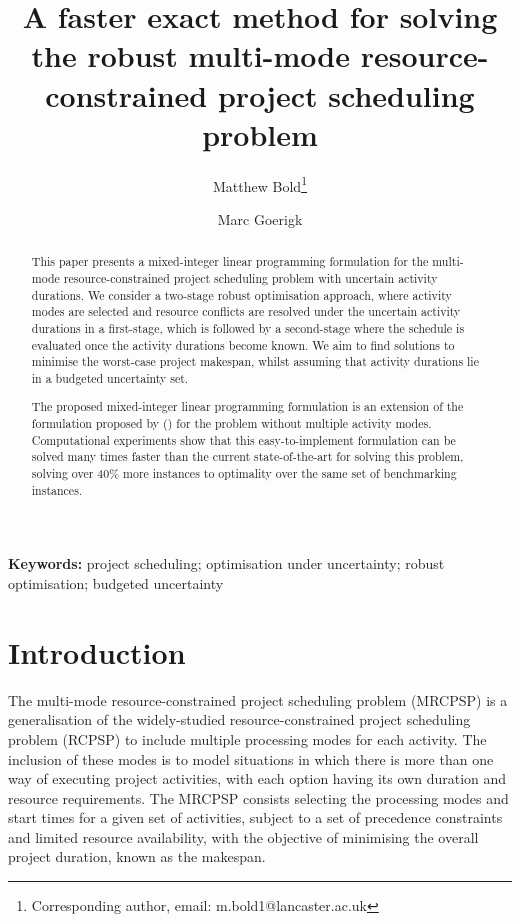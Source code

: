 \documentclass[a4paper,abstracton]{scrartcl}
\begin{document}
\title{A faster exact method for solving the robust multi-mode resource-constrained project scheduling problem}

\author[1]{Matthew Bold\footnote{Corresponding author, email: m.bold1@lancaster.ac.uk}}
\author[2]{Marc Goerigk}

\date{}

\maketitle

\nobibliography*  %

\begin{abstract}
	This paper presents a mixed-integer linear programming formulation for the multi-mode resource-constrained project scheduling problem with uncertain activity durations. We consider a two-stage robust optimisation approach, where activity modes are selected and resource conflicts are resolved under the uncertain activity durations in a first-stage, which is followed by a second-stage where the schedule is evaluated once the activity durations become known. We aim to find solutions to minimise the worst-case project makespan, whilst assuming that activity durations lie in a budgeted uncertainty set.

	The proposed mixed-integer linear programming formulation is an extension of the formulation proposed by \cite{bold2021compact} () for the problem without multiple activity modes. Computational experiments show that this easy-to-implement formulation can be solved many times faster than the current state-of-the-art for solving this problem, solving over 40\% more instances to optimality over the same set of benchmarking instances. 
\end{abstract}

\noindent\textbf{Keywords:} project scheduling; optimisation under uncertainty; robust optimisation; budgeted uncertainty


\section{Introduction}
The multi-mode resource-constrained project scheduling problem (MRCPSP) is a generalisation of the widely-studied resource-constrained project scheduling problem (RCPSP) to include multiple processing modes for each activity. The inclusion of these modes is to model situations in which there is more than one way of executing project activities, with each option having its own duration and resource requirements. The MRCPSP consists selecting the processing modes and start times for a given set of activities, subject to a set of precedence constraints and limited resource availability, with the objective of minimising the overall project duration, known as the makespan.
\end{document}
